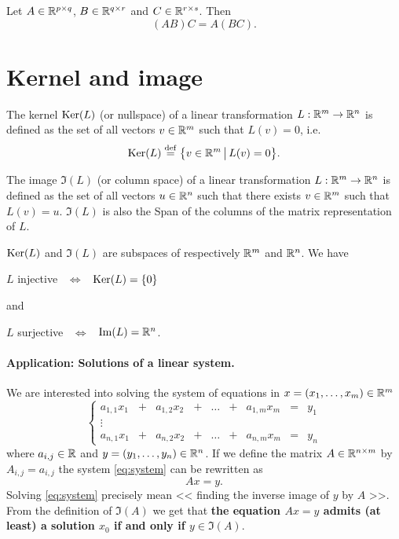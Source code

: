 \documentclass[11pt,nocut]{article}
\begin{document}
\begin{proposition}
	Let $A \in \mathbb{R}^{p \times q}$, $B \in \mathbb{R}^{q \times r}$ and $C \in \mathbb{R}^{r \times s}$. Then
	$$
	(AB) C = A (BC).
	$$
\end{proposition}


\section{Kernel and image}

\begin{definition}[Kernel]
	The kernel ${{\rm Ker}}(L)$ (or nullspace) of a linear transformation $L: \mathbb{R}^m \to \mathbb{R}^n$ is defined as the set of all vectors $v \in \mathbb{R}^m$ such that $L(v) = 0$, i.e.
	$$
	{{\rm Ker}}(L) \overset{\rm def}{=} \big\{ v \in \mathbb{R}^m \, \big| \, L(v) = 0 \big\}.
	$$
\end{definition}

\begin{definition}[Image]
	The image $\Im(L)$ (or column space) of a linear transformation $L: \mathbb{R}^m \to \mathbb{R}^n$ is defined as the set of all vectors $u \in \mathbb{R}^n$ such that there exists $v \in \mathbb{R}^m$ such that $L(v) = u$. 
	$\Im(L)$ is also the Span of the columns of the matrix representation of $L$.
\end{definition}

\begin{proposition}\label{prop:inj_sur}
	${{\rm Ker}}(L)$ and $\Im(L)$ are subspaces of respectively $\mathbb{R}^m$ and $\mathbb{R}^n$. We have
	\begin{center}
		$L$ injective \ $\Longleftrightarrow$ \ ${{\rm Ker}}(L) = \{0 \}$
	\end{center}
	and
	\begin{center}
		$L$ surjective \ $\Longleftrightarrow$ \ ${{\rm Im}}(L) = \mathbb{R}^n$.
	\end{center}
\end{proposition}

\paragraph{Application: Solutions of a linear system.}
We are interested into solving the system of equations in $x = (x_1, \dots, x_m) \in \mathbb{R}^m$
\begin{equation}\label{eq:system}
	\left\{
		\begin{array}{ccccccccc}
			a_{1,1} x_1 &+& a_{1,2} x_2 &+& \dots &+& a_{1,m} x_m &=& y_1 \\
			\vdots &&&&&&&& \\
			a_{n,1} x_1 &+& a_{n,2} x_2 &+& \dots &+& a_{n,m} x_m &=& y_n
		\end{array}
	\right.
\end{equation}
where $a_{i,j} \in \mathbb{R}$ and $y = (y_1, \dots, y_n) \in \mathbb{R}^n$. If we define the matrix $A \in \mathbb{R}^{n \times m}$ by $A_{i,j} = a_{i,j}$ the system \eqref{eq:system} can be rewritten as
$$
A x = y.
$$
Solving \eqref{eq:system} precisely mean << finding the inverse image of $y$ by $A$ >>. From the definition of $\Im(A)$ we get that 
\textbf{the equation $Ax = y$ admits (at least) a solution $x_0$ if and only if $y \in \Im(A)$}.
\\
\end{document}
